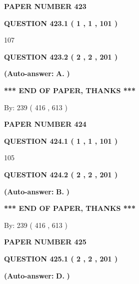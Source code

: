 \documentclass[12pt]{article}
\begin{document}
   
\newpage 
\setcounter{page}{ 
   423001 } 
   
   
 {\textbf{ \Large{ PAPER NUMBER  423  }}}
   
   
   
   
  
  
{\textbf{\large{QUESTION
423.1 
 ( 1 , 1 , 101 )
}}}

107
  
  
{\textbf{\large{QUESTION
423.2 
 ( 2 , 2 , 201 )
}}}
 
 
{\textbf{(Auto-answer:}}
{\textbf{\large{
A.}}}
{\textbf{)}}
 
 
   
   
   
   
\vspace{1.0in} 
{\textbf{\large{ *** END OF PAPER, THANKS *** }}} 
   
   
\hspace{1.0in} By: 
 239 ( 416 ,  613 )
   
   
   
   
\newpage 
\setcounter{page}{ 
   424001 } 
   
   
 {\textbf{ \Large{ PAPER NUMBER  424  }}}
   
   
   
   
  
  
{\textbf{\large{QUESTION
424.1 
 ( 1 , 1 , 101 )
}}}

105
  
  
{\textbf{\large{QUESTION
424.2 
 ( 2 , 2 , 201 )
}}}
 
 
{\textbf{(Auto-answer:}}
{\textbf{\large{
B.}}}
{\textbf{)}}
 
 
   
   
   
   
\vspace{1.0in} 
{\textbf{\large{ *** END OF PAPER, THANKS *** }}} 
   
   
\hspace{1.0in} By: 
 239 ( 416 ,  613 )
   
   
   
   
\newpage 
\setcounter{page}{ 
   425001 } 
   
   
 {\textbf{ \Large{ PAPER NUMBER  425  }}}
   
   
   
   
  
  
{\textbf{\large{QUESTION
425.1 
 ( 2 , 2 , 201 )
}}}
 
 
{\textbf{(Auto-answer:}}
{\textbf{\large{
D.}}}
{\textbf{)}}
 
 
  
\end{document}
